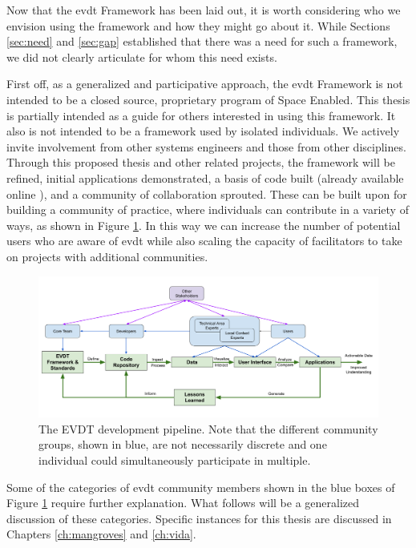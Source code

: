 Now that the \ac{evdt} Framework has been laid out, it is worth considering who we envision using the framework and how they might go about it. While Sections \ref{sec:need} and \ref{sec:gap} established that there was a need for such a framework, we did not clearly articulate for whom this need exists. 

First off, as a generalized and participative approach, the \ac{evdt} Framework is not intended to be a closed source, proprietary program of Space Enabled. This thesis is partially intended as a guide for others interested in using this framework. It also is not intended to be a framework used by isolated individuals. We actively invite involvement from other systems engineers and those from other disciplines. Through this proposed thesis and other related projects, the framework will be refined, initial applications demonstrated, a basis of code built (already available online \cite{bluerasterBlueRasterVida2021,reidEVDTRepository2020,reidMITVidaRepository2021}), and a community of collaboration sprouted. These can be built upon for building a community of practice, where individuals can contribute in a variety of ways, as shown in Figure \ref{fig:development}. In this way we can increase the number of potential users who are aware of \ac{evdt} while also scaling the capacity of facilitators to take on projects with additional communities.

\begin{figure}[!htb]
	\centering
	\includegraphics[scale=0.25]{Figures/chap3/Graphic_2_Development.png}
	\caption[The EVDT development pipeline] {The EVDT development pipeline. Note that the different community groups, shown in blue, are not necessarily discrete and one individual could simultaneously participate in multiple.}
	\label{fig:development}
\end{figure}

Some of the categories of \ac{evdt} community members shown in the blue boxes of Figure \ref{fig:development} require further explanation. What follows will be a generalized discussion of these categories. Specific instances for this thesis are discussed in Chapters \ref{ch:mangroves} and \ref{ch:vida}.

